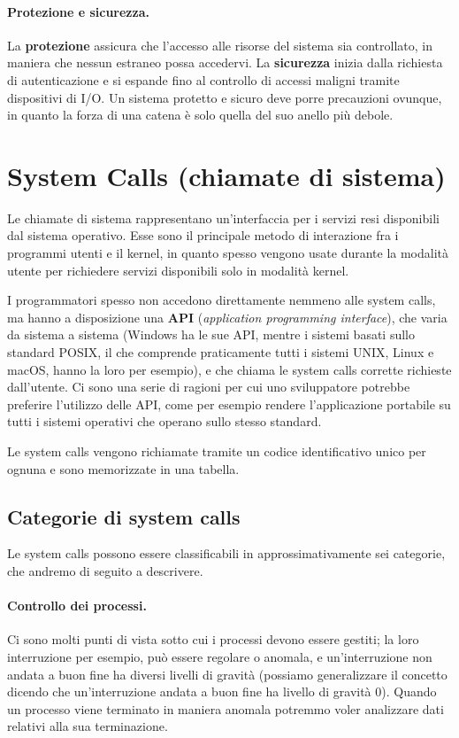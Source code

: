         \paragraph{Protezione e sicurezza.} La \textbf{protezione} assicura che l'accesso alle risorse del sistema sia controllato, in maniera che nessun estraneo possa accedervi. La \textbf{sicurezza} inizia dalla richiesta di autenticazione e si espande fino al controllo di accessi maligni tramite dispositivi di I/O. Un sistema protetto e sicuro deve porre precauzioni ovunque, in quanto la forza di una catena è solo quella del suo anello più debole.
        
\section{System Calls (chiamate di sistema)}
    Le chiamate di sistema rappresentano un'interfaccia per i servizi resi disponibili dal sistema operativo. Esse sono il principale metodo di interazione fra i programmi utenti e il kernel, in quanto spesso vengono usate durante la modalità utente per richiedere servizi disponibili solo in modalità kernel.
    
    I programmatori spesso non accedono direttamente nemmeno alle system calls, ma hanno a disposizione una \textbf{API} (\textit{application programming interface}), che varia da sistema a sistema (Windows ha le sue API, mentre i sistemi basati sullo standard POSIX, il che comprende praticamente tutti i sistemi UNIX, Linux e macOS, hanno la loro per esempio), e che chiama le system calls corrette richieste dall'utente. Ci sono una serie di ragioni per cui uno sviluppatore potrebbe preferire l'utilizzo delle API, come per esempio rendere l'applicazione portabile su tutti i sistemi operativi che operano sullo stesso standard.
    
    Le system calls vengono richiamate tramite un codice identificativo unico per ognuna e sono memorizzate in una tabella.
    
    \subsection{Categorie di system calls}
        Le system calls possono essere classificabili in approssimativamente sei categorie, che andremo di seguito a descrivere.
        
        \paragraph{Controllo dei processi.} Ci sono molti punti di vista sotto cui i processi devono essere gestiti; la loro interruzione per esempio, può essere regolare o anomala, e un'interruzione non andata a buon fine ha diversi livelli di gravità (possiamo generalizzare il concetto dicendo che un'interruzione andata a buon fine ha livello di gravità 0). Quando un processo viene terminato in maniera anomala potremmo voler analizzare dati relativi alla sua terminazione.
        
